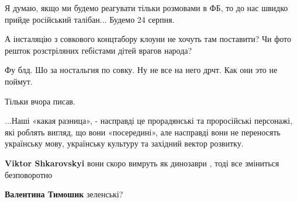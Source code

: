 \begin{itemize}
Я думаю, якщо ми будемо реагувати тільки розмовами в ФБ, то до нас швидко прийде російський талібан... Будемо 24 серпня.

 
А інсталяцію з совкового концтабору клоуни не хочуть там поставити? Чи фото решток розстріляних гебістами дітей врагов народа?

 
Фу блд. Шо за ностальгия по совку. Ну не все на него дрчт. Как они это не поймут.

 

Тільки вчора писав.

...Наші «какая разница», - насправді це прорадянські та проросійські персонажі,
які роблять вигляд, що вони «посередині», але насправді вони не переносять
українську мову, українську культуру та західний вектор розвитку.

\begin{itemize}
 
\textbf{Viktor Shkarovskyi} вони скоро вимруть як динозаври , тоді все зміниться безповоротно

 
\textbf{Валентина Тимошик} зеленські?

 

\end{itemize}
\end{itemize}
